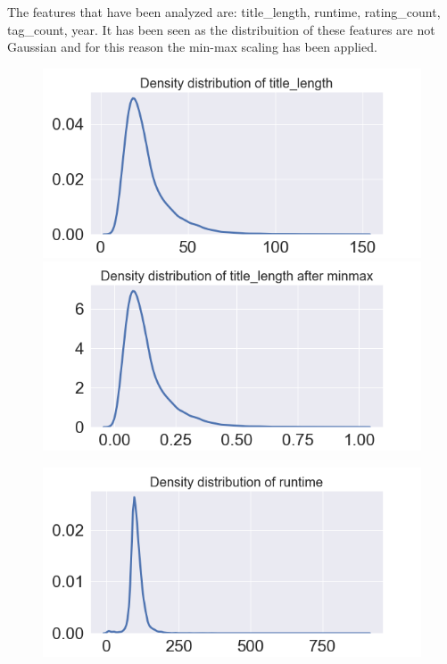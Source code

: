 \documentclass[../main]{subfiles}
\begin{document}
The features that have been analyzed are: title\_length, runtime, rating\_count, tag\_count, year.
It has been seen as the distribuition of these features are not Gaussian and for this reason the min-max scaling has been applied.
\begin{figure}[htb]
    \begin{minipage}[t]{.19\linewidth}
        \centering
        \includegraphics[width=\linewidth]{figures/original_title_len.png}
        \includegraphics[width=\linewidth]{figures/minmax_title_len.png}
    \end{minipage}
    \hfill
    \begin{minipage}[t]{.19\linewidth}
        \centering
        \includegraphics[width=\linewidth]{figures/original_runtime.png}

\end{minipage}
\end{figure}
\end{document}

